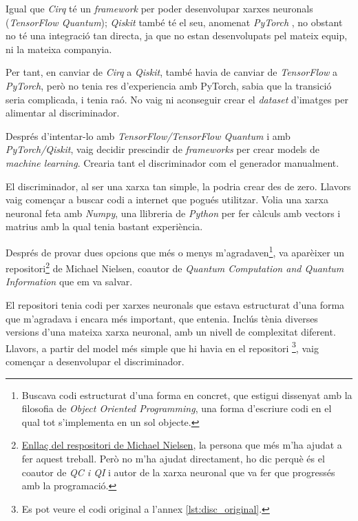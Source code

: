 Igual que \textit{Cirq} té un \textit{framework} per poder desenvolupar xarxes neuronals (\textit{TensorFlow Quantum}); \textit{Qiskit} també té el seu, anomenat \textit{PyTorch} \cite{pytorch_2019}, no obstant no té una integració tan directa, ja que no estan desenvolupats pel mateix equip, ni la mateixa companyia.

Per tant, en canviar de \textit{Cirq} a \textit{Qiskit}, també havia de canviar de \textit{TensorFlow} a \textit{PyTorch}, però no tenia res d'experiencia amb PyTorch, sabia que la transició seria complicada, i tenia raó. No vaig ni aconseguir crear el \textit{dataset} d'imatges per alimentar al discriminador.

Després d'intentar-lo amb \textit{TensorFlow/TensorFlow Quantum} i amb \textit{PyTorch/Qiskit}, vaig decidir prescindir de \textit{frameworks} per crear models de \textit{machine learning}. Crearia tant el discriminador com el generador manualment. 

El discriminador, al ser una xarxa tan simple, la podria crear des de zero. Llavors vaig començar a buscar codi a internet que pogués utilitzar. Volia una xarxa neuronal feta amb \textit{Numpy}, una llibreria de \textit{Python} per fer càlculs amb vectors i matrius amb la qual tenia bastant experiència.

Després de provar dues opcions que més o menys m'agradaven\footnote{Buscava codi estructurat d'una forma en concret, que estigui dissenyat amb la filosofia de \textit{Object Oriented Programming}, una forma d'escriure codi en el qual tot s'implementa en un sol objecte.}, va aparèixer un repositori\footnote{\href{https://github.com/mnielsen/neural-networks-and-deep-learning}{Enllaç del respositori de Michael Nielsen}, la persona que més m'ha ajudat a fer aquest treball. Però no m'ha ajudat directament, ho dic perquè és el coautor de \textit{QC i QI} \cite{QCandQI} i autor de la xarxa neuronal que va fer que progressés amb la programació. } de Michael Nielsen, coautor de \textit{Quantum Computation and Quantum Information} \cite{QCandQI} que em va salvar. 

El repositori tenia codi per xarxes neuronals que estava estructurat d'una forma que m'agradava i encara més important, que entenia. Inclús tènia diverses versions d'una mateixa xarxa neuronal, amb un nivell de complexitat diferent. Llavors, a partir del model més simple que hi havia en el repositori \footnote{Es pot veure el codi original a l'annex \ref{lst:disc_original}.}, vaig començar a desenvolupar el discriminador.

